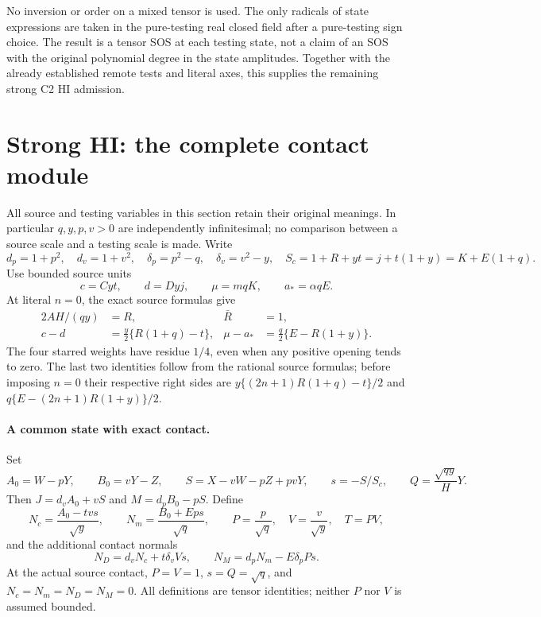 No inversion or order on a mixed tensor is used. The only radicals of
state expressions are taken in the pure-testing real closed field after
a pure-testing sign choice. The result is a tensor SOS at each testing
state, not a claim of an SOS with the original polynomial degree in the
state amplitudes. Together with the already established remote tests
and literal axes, this supplies the remaining strong C2 HI admission.



\section{\texorpdfstring{Strong HI: the complete contact module}{Strong HI: the complete contact module}}
\label{component:p888d9f79ba3b}

\label{p888d9f79ba3b:sec:r7-hi-n0-retained}
All source and testing variables in this section retain their original
meanings. In particular $q,y,p,v>0$ are independently infinitesimal;
no comparison between a source scale and a testing scale is made.
Write
\[
 d_p=1+p^2,\quad d_v=1+v^2,\quad
 \delta_p=p^2-q,\quad\delta_v=v^2-y,\quad
 S_c=1+R+yt=j+t(1+y)=K+E(1+q).
\]
Use bounded source units
\[
 c=Cyt,\qquad d=Dyj,\qquad \mu=mqK,\qquad a_*=\alpha qE.
\]
At literal $n=0$, the exact source formulas give
\begin{align}
 2AH/(qy)&=R, & \bar R&=1,\\
 c-d&=\frac y2\{R(1+q)-t\},&
 \mu-a_*&=\frac q2\{E-R(1+y)\}.                 \tag{N0M.1}
\end{align}
The four starred weights have residue $1/4$, even when any positive
opening tends to zero. The last two identities follow from the rational
source formulas; before imposing $n=0$ their respective right sides are
$y\{(2n+1)R(1+q)-t\}/2$ and
$q\{E-(2n+1)R(1+y)\}/2$.

\paragraph{A common state with exact contact.}
Set
\[
 A_0=W-pY,\qquad B_0=vY-Z,\qquad
 S=X-vW-pZ+pvY,\qquad s=-S/S_c,
 \qquad Q=\frac{\sqrt{qy}}H Y.
\]
Then $J=d_vA_0+vS$ and $M=d_pB_0-pS$. Define
\[
 N_c=\frac{A_0-tv s}{\sqrt y},\qquad
 N_m=\frac{B_0+Ep s}{\sqrt q},\qquad
 P=\frac p{\sqrt q},\quad V=\frac v{\sqrt y},\quad T=PV,
\]
and the additional contact normals
\[
 N_D=d_vN_c+t\delta_vVs,\qquad
 N_M=d_pN_m-E\delta_pPs.                         \tag{N0M.2}
\]
At the actual source contact, $P=V=1$, $s=Q=\sqrt q$, and
$N_c=N_m=N_D=N_M=0$. All definitions are tensor identities; neither
$P$ nor $V$ is assumed bounded.

